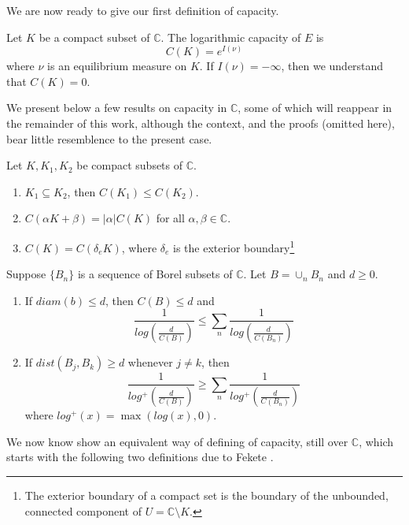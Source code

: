 We are now ready to give our first definition of capacity.\\

\begin{definition}
\cite{rand} Let $K$ be a compact subset of $\mathbb{C}$. The logarithmic capacity of $E$ is 
\[C(K) = e^{I(\nu)}\] where $\nu$ is an equilibrium measure on $K$. If $I(\nu)=-\infty$, then we understand that $C(K) =0$.
\end{definition}

We present below a few results on capacity in $\mathbb{C}$, some of which will reappear in the remainder of this work, although the context, and the proofs (omitted here), bear little resemblence to the present case.\\ 

\begin{proposition}
 Let $K,  K_1,K_2$ be compact subsets of $\mathbb{C}$.
\begin{enumerate}
\item $K_1 \subseteq K_2$, then $C(K_1) \leq C(K_2)$.
\item $C(\alpha K + \beta) = \lvert \alpha \rvert C(K)$ for all $\alpha, \beta \in \mathbb{C}$.
\item $C(K) = C(\delta_eK)$, where $\delta_e$ is the exterior boundary\footnote{The exterior boundary of a compact set is the boundary of the unbounded, connected component of $U = \mathbb{C}\setminus K$.}
\end{enumerate}
\end{proposition}

\begin{proposition}
Suppose $\{B_n\}$ is a sequence of Borel subsets of $\mathbb{C}$. Let $B=\cup_n B_n$ and $d \geq 0$. 
\begin{enumerate}
\item If $diam(b) \leq d$, then $C(B) \leq d$ and \[\frac{1}{log(\frac{d}{C(B)})} \leq \sum_n \frac{1}{log(\frac{d}{C(B_n)})}\]
\item If $dist(B_j, B_k) \geq d$ whenever $j \neq k$, then \[\frac{1}{log^+(\frac{d}{C(B)})} \geq \sum_n \frac{1}{log^+(\frac{d}{C(B_n)})}\] where $log^+(x) = \max(log(x),0)$.
\end{enumerate}
\end{proposition}



We now know show an equivalent way of  defining of capacity, still over $\mathbb{C}$, which starts with the following two definitions due to Fekete \cite{fek}.\\ 

